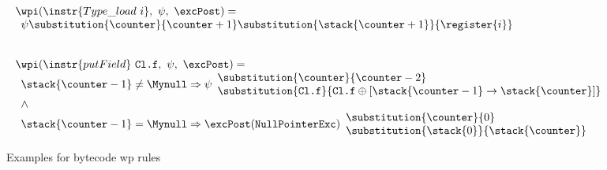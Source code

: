
\begin{figure}[htp]
\[
\begin{array}{l}
\wpi(\instr{Type\_load \ i}, \ \psi, \ \excPost)  = \\
\begin{array}{l}  \psi\substitution{\counter }{\counter+1} \substitution{\stack{\counter+1}}{\register{i}} \end{array} \\
\\
\\
 \wpi(\instr{putField} \ \texttt{Cl.f}, \ \psi, \ \excPost)  = \\
\begin{array}{l}
   		\stack{\counter -1} \not= \Mynull\Rightarrow   
	 \psi\begin{array}{l} \substitution{\counter}{ \counter-2 } \\[0 mm] 
   	                   \substitution{\texttt{Cl.f} }{ \texttt{Cl.f}\oplus [\stack{\counter -1} \rightarrow \stack{\counter}] } \\
		\end{array}\\

   \wedge \\
   	\stack{\counter-1} = \Mynull 	\Rightarrow \excPost(\tt{NullPointerExc})
        \begin{array}{l}
          \substitution{ \counter }{ 0} \\
          \substitution{\stack{0}}{ \stack{\counter}} 
	\end{array}
    \end{array} %
\end{array}
 \]	  
\caption{\sc Examples for bytecode wp rules}
 \label{instrWP}

\end{figure}

